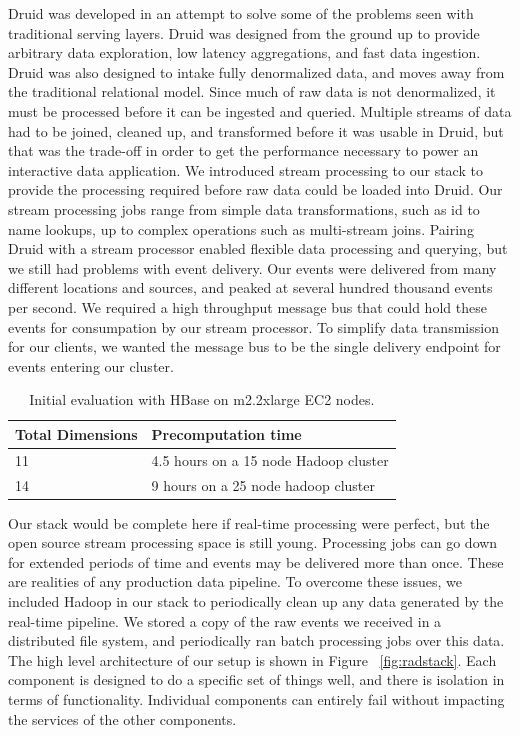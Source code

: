 \documentclass{vldb}
\begin{document}
Druid was developed in an attempt to solve some of the problems seen with
traditional serving layers. Druid was designed from the ground up to provide
arbitrary data exploration, low latency aggregations, and fast data ingestion.
Druid was also designed to intake fully denormalized data, and moves away from
the traditional relational model. Since much of raw data is not denormalized,
it must be processed before it can be ingested and queried. Multiple streams of
data had to be joined, cleaned up, and transformed before it was usable in
Druid, but that was the trade-off in order to get the performance necessary to
power an interactive data application. We introduced stream processing to our
stack to provide the processing required before raw data could be loaded into
Druid. Our stream processing jobs range from simple data transformations, such
as id to name lookups, up to complex operations such as multi-stream joins.
Pairing Druid with a stream processor enabled flexible data processing and
querying, but we still had problems with event delivery.  Our events were
delivered from many different locations and sources, and peaked at several
hundred thousand events per second. We required a high throughput message bus
that could hold these events for consumpation by our stream processor.  To
simplify data transmission for our clients, we wanted the message bus to be the
single delivery endpoint for events entering our cluster.  

\begin{table}
\centering
\scriptsize\begin{tabular}{| l | l |} \hline
\textbf{Total Dimensions} & \textbf{Precomputation time} \\ \hline
  11 & 4.5 hours on a 15 node Hadoop cluster \\ \hline
  14 & 9 hours on a 25 node hadoop cluster \\ \hline
\end{tabular}
\normalsize
\caption{Initial evaluation with HBase on m2.2xlarge EC2 nodes.}
\label{tab:hbase_results}
\end{table}

Our stack would be complete here if real-time processing were perfect, but the
open source stream processing space is still young. Processing jobs can go down
for extended periods of time and events may be delivered more than once.  These
are realities of any production data pipeline. To overcome these issues, we
included Hadoop in our stack to periodically clean up any data generated by the
real-time pipeline. We stored a copy of the raw events we received in a
distributed file system, and periodically ran batch processing jobs over this
data. The high level architecture of our setup is shown in Figure
~\ref{fig:radstack}. Each component is designed to do a specific set of things
well, and there is isolation in terms of functionality. Individual components
can entirely fail without impacting the services of the other components.
\end{document}
